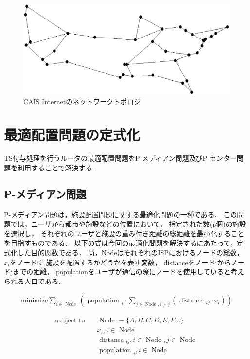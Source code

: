 \documentclass[a4j,11pt]{jreport}
\begin{document}
\begin{figure}[htbp]
  \centering
  \includegraphics[scale=0.585]{data/CAIS_Internet.eps}
  \vspace{0mm}
  \caption{CAIS Internetのネットワークトポロジ}
  \label{fig:CAIS}
\end{figure}

\section{最適配置問題の定式化}
TS付与処理を行うルータの最適配置問題をP-メディアン問題及びP-センター問題を利用することで解決する．


\subsection{P-メディアン問題}
P-メディアン問題は，施設配置問題に関する最適化問題の一種である．
この問題では，ユーザから都市や施設などの位置において，
指定された数(p個)の施設を選択し，
それぞれのユーザと施設の重み付き距離の総距離を最小化することを目指すものである．
以下の式は今回の最適化問題を解決するにあたって，定式化した目的関数である．
尚，NodeはそれぞれのISPにおけるノードの総数，
$x_{i}$をノードiに施設を配置するかどうかを表す変数，
distanceをノードiからノードjまでの距離，
populationをユーザが通信の際にノードを使用していると考えられる人口である．

\begin{align}
  \label{p-median}
  \mbox{minimize}    \sum_{i \in \mbox{ Node }}\left(\mbox { population }_i \cdot \sum_{j \in \mbox { Node }, i \neq j}\left(\mbox { distance }_{i j} \cdot x_{i}\right)\right)
\end{align}

\begin{align}
  \text{subject to} \quad & \mbox{ Node }=\{A, B, C, D, E, F\dots\}                              \\
                          & x_{i}, i \in \mbox { Node }                                          \\
                          & \mbox { distance }_{i j}, i \in \mbox { Node }, j \in \mbox { Node } \\
                          & \mbox { population }_i, i \in \mbox { Node }
\end{align}
\end{document}
